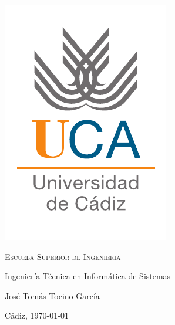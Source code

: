 \begin{titlepage}
  \centering
  \includegraphics[width=.3\textwidth]{logo_uca}

  \bigskip
  \bigskip
  \bigskip
  
  \begin{changemargin}{3em}{3em}
    \centering

    {\Huge \textsc{\nohyphens{Escuela Superior de Ingeniería}}}
    
    \bigskip
    \bigskip
    \bigskip

    {\huge \nohyphens{Ingeniería Técnica en Informática de Sistemas}}

    \bigskip
    \bigskip
    \bigskip
    \bigskip
    \bigskip
    \bigskip

    \begin{doublespace}
      {\LARGE \nohyphens{\nombreProyecto}}
    \end{doublespace}


    \bigskip
    \bigskip
    \bigskip
    \bigskip

    \bigskip
    \bigskip
    \bigskip
    \bigskip
    \bigskip
    \bigskip
    \bigskip
      
  \end{changemargin}

  {\Large José Tomás Tocino García \\}

  \bigskip

  {\large Cádiz, \today}

\end{titlepage}


